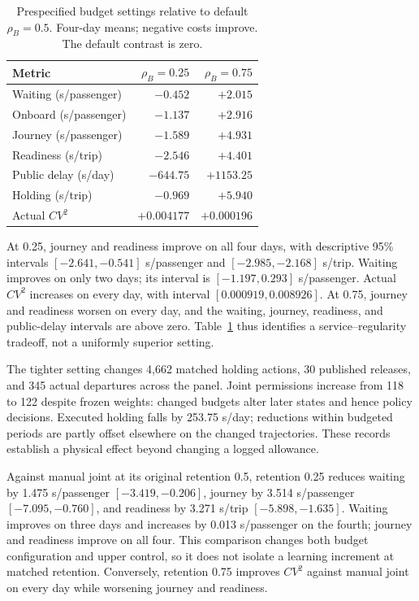 \begin{table}[t]
\centering
\caption{Prespecified budget settings relative to default $\rho_B=0.5$.
Four-day means; negative costs improve. The default contrast is zero.}
\label{tab:budget_settings}
\setlength{\tabcolsep}{6pt}
\footnotesize
\begin{tabular}{lrr}
\toprule
Metric & $\rho_B=0.25$ & $\rho_B=0.75$ \\
\midrule
Waiting (s/passenger) & $-0.452$ & $+2.015$ \\
Onboard (s/passenger) & $-1.137$ & $+2.916$ \\
Journey (s/passenger) & $-1.589$ & $+4.931$ \\
Readiness (s/trip) & $-2.546$ & $+4.401$ \\
Public delay (s/day) & $-644.75$ & $+1153.25$ \\
Holding (s/trip) & $-0.969$ & $+5.940$ \\
Actual $CV^2$ & $+0.004177$ & $+0.000196$ \\
\bottomrule
\end{tabular}
\end{table}

At 0.25, journey and readiness improve on all four days, with descriptive
95\% intervals $[-2.641,-0.541]$ s/passenger and $[-2.985,-2.168]$ s/trip.
Waiting improves on only two days; its interval is $[-1.197,0.293]$
s/passenger. Actual $CV^2$ increases on every day, with interval
$[0.000919,0.008926]$. At 0.75, journey and readiness worsen on every day,
and the waiting, journey, readiness, and public-delay intervals are above zero.
Table~\ref{tab:budget_settings} thus identifies a service--regularity tradeoff,
not a uniformly superior setting.

The tighter setting changes 4,662 matched holding actions, 30 published
releases, and 345 actual departures across the panel. Joint permissions
increase from 118 to 122 despite frozen weights: changed budgets alter later
states and hence policy decisions. Executed holding falls by 253.75 s/day;
reductions within budgeted periods are partly offset elsewhere on the changed
trajectories. These records establish a physical effect beyond changing a
logged allowance.

Against manual joint at its original retention 0.5, retention 0.25 reduces
waiting by 1.475 s/passenger $[-3.419,-0.206]$, journey by 3.514 s/passenger
$[-7.095,-0.760]$, and readiness by 3.271 s/trip $[-5.898,-1.635]$.
Waiting improves on three days and increases by 0.013 s/passenger on the fourth;
journey and readiness improve on all four. This comparison changes both
budget configuration and upper control, so it does not isolate a learning
increment at matched retention. Conversely, retention 0.75 improves $CV^2$
against manual joint on every day while worsening journey and readiness.

